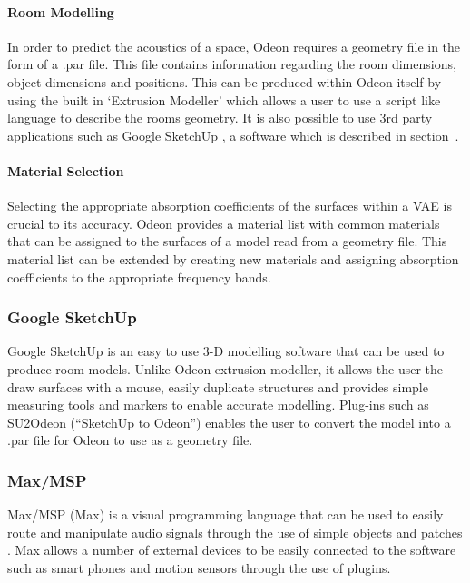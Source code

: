 \documentclass[../../main.tex]{subfiles}
\begin{document}
		\paragraph{Room Modelling}

			In order to predict the acoustics of a space, Odeon requires a geometry file in the form of a .par file. This file contains information regarding the room dimensions, object dimensions and positions. This can be produced within Odeon itself by using the built in `Extrusion Modeller' which allows a user to use a script like language to describe the rooms geometry. It is also possible to use 3rd party applications such as Google SketchUp \cite{SKU}, a software which is described in section~.

		\paragraph{Material Selection}
			Selecting the appropriate absorption coefficients of the surfaces within a \ac{VAE} is crucial to its accuracy. Odeon provides a material list with common materials that can be assigned to the surfaces of a model read from a geometry file. This material list can be extended by creating new materials and assigning absorption coefficients to the appropriate frequency bands.

	\subsubsection{Google SketchUp}\label{GSU}
		Google SketchUp \cite{SKU} is an easy to use 3-D modelling software that can be used to produce room models. Unlike Odeon extrusion modeller, it allows the user the draw surfaces with a mouse, easily duplicate structures and provides simple measuring tools and markers to enable accurate modelling. Plug-ins such as SU2Odeon (``SketchUp to Odeon'') \cite{SU2Odeon} enables the user to convert the model into a .par file for Odeon to use as a geometry file.

	\subsubsection{Max/MSP}
		Max/MSP (Max) is a visual programming language that can be used to easily route and manipulate audio signals through the use of simple objects and patches \cite{max}. Max allows a number of external devices to be easily connected to the software such as smart phones and motion sensors through the use of plugins.
\end{document}
